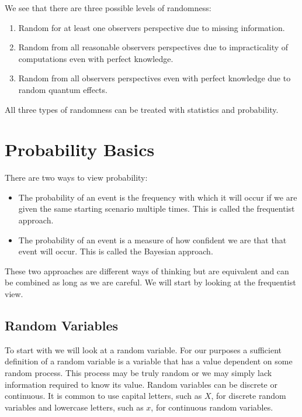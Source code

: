     We see that there are three possible levels of randomness:
    \begin{enumerate}
        \item Random for at least one observers perspective due to missing information.
        \item Random from all reasonable observers perspectives due to impracticality of computations even with perfect knowledge.
        \item Random from all observers perspectives even with perfect knowledge due to random quantum effects.
    \end{enumerate}
    All three types of randomness can be treated with statistics and probability.

    \section{Probability Basics}
    There are two ways to view probability:
    \begin{itemize}
        \item The probability of an event is the frequency with which it will occur if we are given the same starting scenario multiple times.
        This is called the frequentist approach.
        \item The probability of an event is a measure of how confident we are that that event will occur.
        This is called the Bayesian approach.
    \end{itemize}
    These two approaches are different ways of thinking but are equivalent and can be combined as long as we are careful.
    We will start by looking at the frequentist view.
    
    \subsection{Random Variables}
    To start with we will look at a random variable.
    For our purposes a sufficient definition of a random variable is a variable that has a value dependent on some random process.
    This process may be truly random or we may simply lack information required to know its value.
    Random variables can be discrete or continuous.
    It is common to use capital letters, such as \(X\), for discrete random variables and lowercase letters, such as \(x\), for continuous random variables.
    
